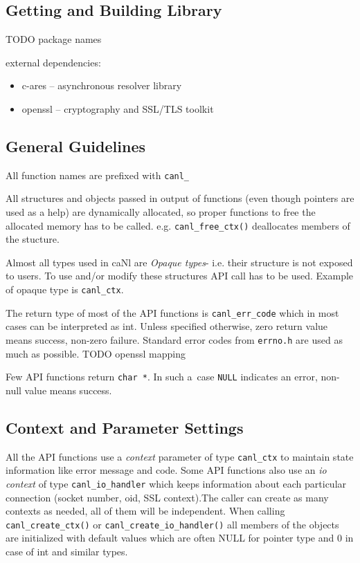 \subsection{Getting and Building Library}
TODO package names

external dependencies:
\begin{itemize}
\item c-ares -- asynchronous resolver library
\item openssl -- cryptography and SSL/TLS toolkit
\end{itemize}

\subsection{General Guidelines}

%
All function names are prefixed with \verb'canl_'

%
All structures and objects passed in output of functions
(even though pointers are used as a help)
are dynamically allocated, so proper functions to free the allocated 
memory has to be called. e.g. \verb'canl_free_ctx()' 
deallocates members of the stucture.

%
Almost all types used in caNl are \textit{Opaque types}- i.e. their structure is 
not exposed to users. To use and/or modify these structures API call has 
to be used. Example of opaque type is {\tt canl\_ctx}.

%
The return type of most of the API functions is {\tt canl\_err\_code} which
 in most cases can be interpreted as int. Unless specified otherwise, zero
return value means success, non-zero failure. Standard error codes from 
{\tt errno.h} are used as much as possible.
TODO openssl mapping

Few API functions return {\tt char *}. In such a~case
{\tt NULL} indicates an error, non-null value means success.

\subsection{Context and Parameter Settings}
\label{s:context}
All the API functions use a \emph{context} parameter of type {\tt canl\_ctx} 
to maintain state information like error message and code. 
Some API functions also use an \emph{io context} of type {\tt canl\_io\_handler}
which keeps information about each particular connection 
(\eg socket number, oid, SSL context).The caller can create as many 
contexts as needed, all of them will be independent. When calling
\verb'canl_create_ctx()' or \verb'canl_create_io_handler()' all members 
of the objects are initialized with default values which are often 
NULL for pointer type and 0 in case of int and similar types.

